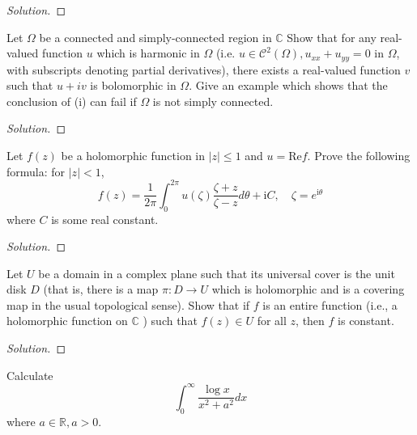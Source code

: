 \documentclass[10pt]{article}
\newenvironment{soln}{\begin{proof}[Solution]}{\end{proof}}
\begin{document}
\begin{soln}

\end{soln}



\begin{problem}
[2002 A-II-4]
Let $\Omega$ be a connected and simply-connected region in $\mathbb{C}$ Show that for any real-valued function $u$ which is harmonic in $\Omega$ (i.e. $u \in \mathcal{C}^2(\Omega), u_{x x}+u_{y y}=0$ in $\Omega$, with subscripts denoting partial derivatives), there exists a real-valued function $v$ such that $u+i v$ is bolomorphic in $\Omega$. Give an example which shows that the conclusion of (i) can fail if $\Omega$ is not simply connected.
\end{problem}

\begin{soln}

\end{soln}



\begin{problem}
[2001 J-I-6]
Let $f(z)$ be a holomorphic function in $|z| \leq 1$ and $u=\text{Re} f$. Prove the following formula: for $|z|<1$,
$$
f(z)=\frac{1}{2 \pi} \int_0^{2 \pi} u(\zeta) \frac{\zeta+z}{\zeta-z} d \theta+\mathrm{i} C, \quad \zeta=e^{\mathrm{i} \theta}
$$
where $C$ is some real constant.
\end{problem}

\begin{soln}

\end{soln}



\begin{problem}
[2001 J-II-5]
Let $U$ be a domain in a complex plane such that its universal cover is the unit disk $D$ (that is, there is a map $\pi: D \rightarrow U$ which is holomorphic and is a covering map in the usual topological sense). Show that if $f$ is an entire function (i.e., a holomorphic function on $\mathbb{C}$ ) such that $f(z) \in U$ for all $z$, then $f$ is constant.
\end{problem}

\begin{soln}

\end{soln}



\begin{problem}
[2001 J-II-6]
Calculate
$$
\int_0^{\infty} \frac{\log x}{x^2+a^2} d x
$$
where $a \in \mathbb{R}, a>0$.
\end{problem}
\end{document}
